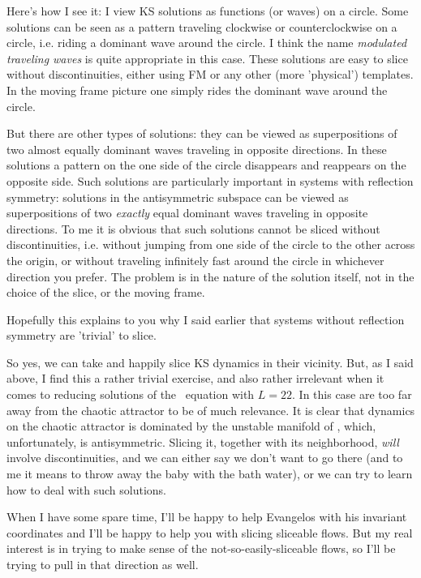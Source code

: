 \begin{description}
    Here's how I see it: I view KS solutions as functions (or waves) on a circle.  Some solutions can be seen as a pattern traveling clockwise or counterclockwise on a circle, i.e. riding a dominant wave around the circle.  I think the name {\em modulated traveling waves} is quite appropriate in this case.  These solutions are easy to slice without discontinuities, either using FM or any other (more 'physical') templates.  In the moving frame picture one simply rides the dominant wave around the circle.

    But there are other types of solutions: they can be viewed as superpositions of two almost equally dominant waves traveling in opposite directions.  In these solutions a pattern on the one side of the circle disappears and reappears on the opposite side.  Such solutions are particularly important in systems with reflection symmetry: solutions in the antisymmetric subspace can be viewed as superpositions of two {\em exactly} equal dominant waves traveling in opposite directions.  To me it is obvious that such solutions cannot be sliced without discontinuities, i.e. without jumping from one side of the circle to the other across the origin, or without traveling infinitely fast around the circle in whichever direction you prefer.  The problem is in the nature of the solution itself, not in the choice of the slice, or the moving frame.

    Hopefully this explains to you why I said earlier that systems without reflection symmetry are 'trivial' to slice.

    So yes, we can take  and happily slice KS dynamics in their vicinity.  But, as I said above, I find this a rather trivial exercise, and also rather irrelevant when it comes to reducing solutions of the \KS\ equation with $L = 22$.  In this case  are too far away from the chaotic attractor to be of much relevance.  It is clear that dynamics on the chaotic attractor is dominated by the unstable manifold of , which, unfortunately, is antisymmetric.  Slicing it, together with its neighborhood, {\em will} involve discontinuities, and we can either say we don't want to go there (and to me it means to throw away the baby with the bath water), or we can try to learn how to deal with such solutions.

    When I have some spare time, I'll be happy to help Evangelos with his invariant coordinates and I'll be happy to help you with slicing sliceable flows.  But my real interest is in trying to make sense of the not-so-easily-sliceable flows, so I'll be trying to pull in that direction as well.

\end{description}

\renewcommand{\ssp}{a}
